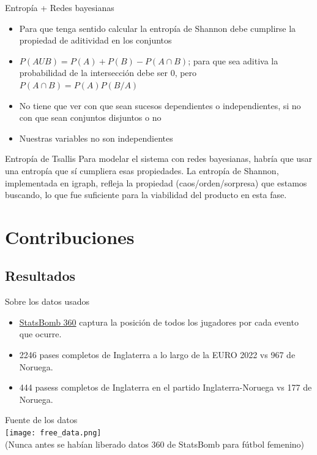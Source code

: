 \documentclass{beamer}
\begin{document}
\begin{frame}{Entropía + Redes bayesianas}
	\begin{itemize}
		\item Para que tenga sentido calcular la entropía de Shannon debe cumplirse la propiedad de aditividad 
		en los conjuntos
		\item $P(A U B) = P(A) + P(B) - P(A \cap B)$; para que sea aditiva la probabilidad de la intersección 
		debe ser 0, pero $P(A \cap B) = P(A)P(B/A)$
		\item No tiene que ver con que sean sucesos dependientes o independientes, si no con que sean 
		conjuntos disjuntos o no
		\item Nuestras variables no son independientes
	\end{itemize}
	\begin{alertblock}{Entropía de Tsallis}
		Para modelar el sistema con redes bayesianas, habría que usar una entropía que sí 
		cumpliera esas propiedades.
		La entropía de Shannon, implementada en igraph, refleja la propiedad (caos/orden/sorpresa) que 
		estamos buscando, lo que fue suficiente para la viabilidad del producto en esta fase.
	\end{alertblock}
	
\end{frame}

\section{Contribuciones}

\subsection{Resultados}

\begin{frame}{Sobre los datos usados}
	\begin{itemize}
		\item \href{https://statsbomb.com/articles/soccer/statsbomb-release-free-360-data-womens-euro-2022-available-now/}{StatsBomb 360}
		captura la posición de todos los jugadores por cada evento que ocurre.
		\item 2246 pases completos de Inglaterra a lo largo de la EURO 2022 vs 967 de Noruega.
		\item 444 pasess completos de Inglaterra en el partido Inglaterra-Noruega vs 177 de Noruega.
	\end{itemize}
	\begin{center}
		Fuente de los datos \\[12pt]
		\texttt{[image: free\_data.png]}
		\\
		\footnotesize(Nunca antes se habían liberado datos 360 de StatsBomb para fútbol femenino)
    \end{center}
\end{frame}
\end{document}

